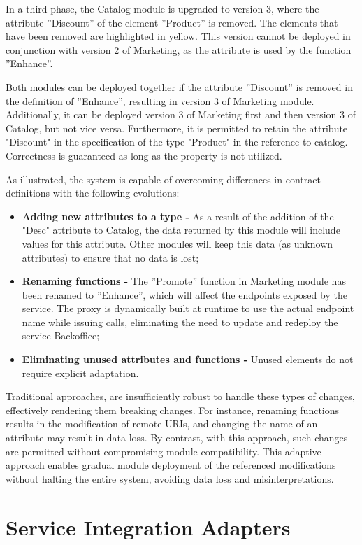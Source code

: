 In a third phase, the Catalog module is upgraded to version 3, where the attribute ''Discount'' of the element ''Product'' is removed.
The elements that have been removed are highlighted in yellow.
This version cannot be deployed in conjunction with version 2 of Marketing, as the attribute is used by the function ''Enhance''.

Both modules can be deployed together if the attribute ''Discount'' is removed in the definition of ''Enhance'', resulting in version 3 of Marketing module.
Additionally, it can be deployed version 3 of Marketing first and then version 3 of Catalog, but not vice versa.
Furthermore, it is permitted to retain the attribute "Discount" in the specification of the type "Product" in the reference to catalog.
Correctness is guaranteed as long as the property is not utilized.

As illustrated,
the system is capable of overcoming differences in contract definitions with the following evolutions:
\begin{itemize}
    \item \textbf{Adding new attributes to a type -} As a result of the addition of the "Desc" attribute to Catalog, the data returned by this module will include values for this attribute.
    Other modules will keep this data (as unknown attributes) to ensure that no data is lost;
    \item \textbf{Renaming functions -} The ''Promote'' function in Marketing module has been renamed to ''Enhance'', which will affect the endpoints exposed by the service.
    The proxy is dynamically built at runtime to use the actual endpoint name while issuing calls, eliminating the need to update and redeploy the service Backoffice;
    \item \textbf{Eliminating unused attributes and functions -} Unused elements do not require explicit adaptation.
\end{itemize}

Traditional approaches, are insufficiently robust to handle these types of changes, effectively rendering them breaking changes.
For instance, renaming functions results in the modification of remote URIs, and changing the name of an attribute may result in data loss.
By contrast, with this approach, such changes are permitted without compromising module compatibility.
This adaptive approach enables gradual module deployment of the referenced modifications without halting the entire system, avoiding data loss and misinterpretations.

\section{Service Integration Adapters} %
\label{sec:service_integration_adapters}

